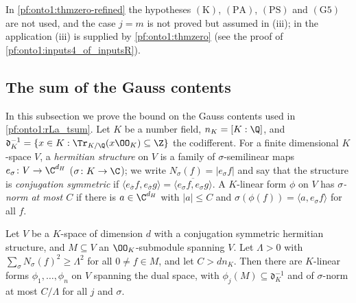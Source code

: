 \begin{remark}\label{pf:onto1:rem-refined}
In \cref{pf:onto1:thmzero-refined} the hypotheses $(\mathrm K)$, $(\mathrm{PA})$, $(\mathrm{PS})$ and $(\mathrm G5)$ are not used, and the
case $j=m$ is not proved but assumed in (iii); in the application (iii) is supplied by \cref{pf:onto1:thmzero}
(see the proof of \cref{pf:onto1:inputs4_of_inputsR}).
\end{remark}

\subsection{The sum of the Gauss contents}\label{sec:pf:onto1:gausssum}

In this subsection we prove the bound on the Gauss contents used in \cref{pf:onto1:rLa_tsum}. Let $K$ be a number
field, $n_K=[K:\Q]$, and $\mathfrak d_K^{-1}=\{x\in K:\Tr_{K/\Q}(x\OO_K)\subseteq\Z\}$ the codifferent. For a finite
dimensional $K$-space $V$, a \emph{hermitian structure} on $V$ is a family of $\sigma$-semilinear maps $e_\sigma\colon
V\to\C^{d_H}$ ($\sigma\colon K\to\C$); we write $N_\sigma(f)=|e_\sigma f|$ and say that the structure is \emph{conjugation
symmetric} if $\langle e_{\bar\sigma}f,e_{\bar\sigma}g\rangle=\overline{\langle e_\sigma f,e_\sigma g\rangle}$. A $K$-linear form $\phi$
on $V$ has \emph{$\sigma$-norm at most $C$} if there is $a\in\C^{d_H}$ with $|a|\le C$ and $\sigma(\phi(f))=\langle a,e_\sigma
f\rangle$ for all $f$.

\begin{lemma}\label{pf:onto1:transf}
Let $V$ be a $K$-space of dimension $d$ with a conjugation symmetric hermitian structure, and $M\subseteq V$ an
$\OO_K$-submodule spanning $V$. Let $\Lambda>0$ with $\sum_\sigma N_\sigma(f)^2\ge\Lambda^2$ for all $0\ne f\in M$, and let
$C>dn_K$. Then there are $K$-linear forms $\phi_1,\dots,\phi_n$ on $V$ spanning the dual space, with $\phi_j(M)\subseteq
\mathfrak d_K^{-1}$ and of $\sigma$-norm at most $C/\Lambda$ for all $j$ and $\sigma$.
\end{lemma}

